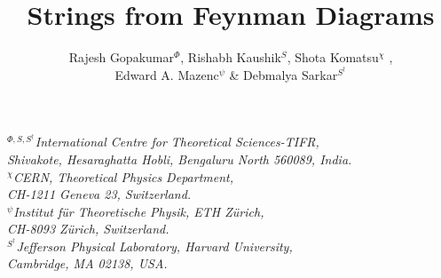\documentclass[english]{article}
\renewcommand{\>}{\rangle}
\newcommand{\<}{\langle}
\renewcommand{\(}{\left(}
\renewcommand{\)}{\right)}
\begin{document}
\title{\bf{Strings from Feynman Diagrams}} 


\author{ Rajesh Gopakumar${^\Phi}$,  Rishabh Kaushik${^S}$,  Shota Komatsu$^{\chi}$ ,\\  Edward A. Mazenc${^{\psi}}$ \&  Debmalya Sarkar$^{S^{\dagger}}$}
\date{}


\maketitle


\begin{center}
    \small{${}^{\Phi, S, S^{\dagger}}$\it{International Centre for Theoretical Sciences-TIFR,\\ Shivakote, Hesaraghatta Hobli, Bengaluru North 560089, India.}}\\
    \vspace{0.1cm}
  \small{${}^\chi$\it{CERN, Theoretical Physics Department,\\ CH-1211 Geneva 23, Switzerland.}}\\
\vspace{0.1cm}
  \small{${}^\psi$\it{Institut für Theoretische Physik, ETH Zürich, \\ CH-8093 Zürich, Switzerland.}}\\
  \vspace{0.1cm}
  \small{${}^{S^{\dagger}}$\it{Jefferson Physical Laboratory, Harvard University, \\Cambridge, MA 02138, USA.}}
\end{center}

\vspace{2cm}
\end{document}
